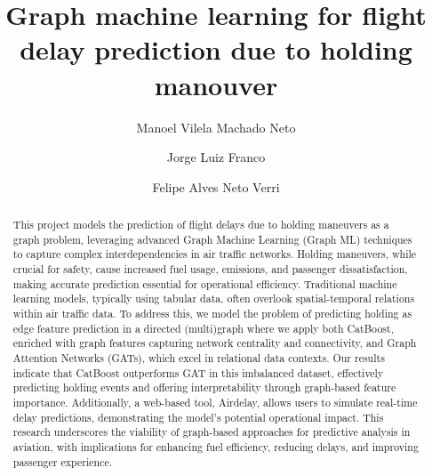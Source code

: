 \documentclass[preprint,12pt,authoryear]{elsarticle}
\begin{document}
\begin{frontmatter}



\title{Graph machine learning for flight delay prediction due to
    holding manouver} %


\author[label1]{Manoel Vilela Machado Neto}
\author[label1]{Jorge Luiz Franco}
\author[label1]{Felipe Alves Neto Verri}


\begin{abstract}
This project models the prediction of flight delays due to holding
maneuvers as a graph problem, leveraging advanced Graph Machine
Learning (Graph ML) techniques to capture complex interdependencies in
air traffic networks. Holding maneuvers, while crucial for safety,
cause increased fuel usage, emissions, and passenger dissatisfaction,
making accurate prediction essential for operational
efficiency. Traditional machine learning models, typically using
tabular data, often overlook spatial-temporal relations within air
traffic data. To address this, we model the problem of predicting
holding as edge feature prediction in a directed (multi)graph where we
apply both CatBoost, enriched with graph features capturing network
centrality and connectivity, and Graph Attention Networks (GATs),
which excel in relational data contexts. Our results indicate that
CatBoost outperforms GAT in this imbalanced dataset, effectively
predicting holding events and offering interpretability through
graph-based feature importance. Additionally, a web-based tool,
Airdelay, allows users to simulate real-time delay predictions,
demonstrating the model's potential operational impact. This research
underscores the viability of graph-based approaches for predictive
analysis in aviation, with implications for enhancing fuel efficiency,
reducing delays, and improving passenger experience.



\end{abstract}
\end{frontmatter}
\end{document}
